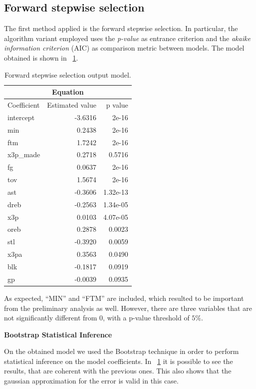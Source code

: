 \subsection{Forward stepwise selection}

The first method applied is the forward stepwise selection. In particular, the algorithm variant employed uses the \textit{p-value} as entrance criterion and the \textit{akaike information criterion} (AIC) as comparison metric between models. The model obtained is shown in \Fig~\ref{table:ForwardModelSummary}.

\begin{table}[H]
	\centering
	\begin{tabular}{|| l | r | r ||} 
		\hline
		\multicolumn{3}{|c|}{Equation} \\
		\hline
		Coefficient & Estimated value & p value \\
		\hline
		intercept & -3.6316 & 2e-16 \\
		min & 0.2438 & 2e-16 \\
		ftm & 1.7242 & 2e-16 \\
		x3p\_made & 0.2718 & 0.5716 \\
		fg & 0.0637 & 2e-16 \\
		tov & 1.5674 & 2e-16 \\
		ast & -0.3606 & 1.32e-13 \\
		dreb & -0.2563 & 1.34e-05 \\
		x3p & 0.0103 & 4.07e-05 \\
		oreb & 0.2878 & 0.0023 \\
		stl & -0.3920 & 0.0059 \\
		x3pa & 0.3563 & 0.0490 \\
		blk & -0.1817 & 0.0919 \\
		gp & -0.0039 & 0.0935 \\
		\hline
	\end{tabular}
	\caption{Forward stepwise selection output model.}
	\label{table:ForwardModelSummary}
\end{table}

As expected, ``MIN'' and ``FTM'' are included, which resulted to be important from the preliminary analysis as well. However, there are three variables that are not significantly different from 0, with a p-value threshold of $5\%$.

\textbf{Bootstrap Statistical Inference}

On the obtained model we used the Bootstrap technique in order to perform statistical inference on the model coefficients. In \Fig~\ref{table:ForwardModelSummary} it is possible to see the results, that are coherent with the previous ones. This also shows that the gaussian approximation for the error is valid in this case. 

